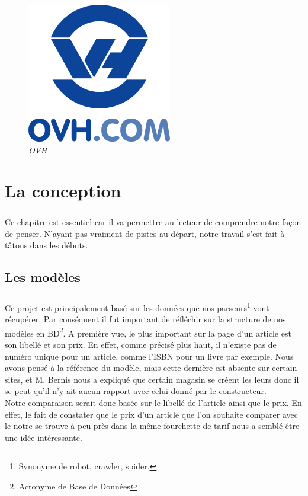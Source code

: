\documentclass{report}
\begin{document}
\begin{figure}[H]
\begin{center}
\includegraphics[scale=1.2]{ovh.jpg}
\caption{\textit{OVH}}
\end{center}
\end{figure}

\chapter{La conception}

\paragraph{}
Ce chapitre est essentiel car il va permettre au lecteur de comprendre notre façon de penser. N'ayant pas vraiment de pistes au départ, notre travail s'est fait à tâtons dans les débuts. 
\section{Les modèles}

\paragraph{}

Ce projet est principalement basé sur les données que nos parseurs\footnote{Synonyme de robot, crawler, spider.} vont récupérer. Par conséquent il fut important de réfléchir sur la structure de nos modèles en BD\footnote{Acronyme de Base de Données}. A première vue, le plus important sur la page d'un article est son libellé et son prix. En effet, comme précisé plus haut, il n'existe pas de numéro unique pour un article, comme l'ISBN pour un livre par exemple. Nous avons pensé à la référence du modèle, mais cette dernière est absente sur certain sites, et M. Bernis nous a expliqué que certain magasin se créent les leurs donc il se peut qu'il n'y ait aucun rapport avec celui donné par le constructeur.\\
Notre comparaison serait donc basée sur le libellé de l'article ainsi que le prix. En effet, le fait de constater que le prix d'un article que l'on souhaite comparer avec le notre se trouve à peu près dans la même fourchette de tarif nous a semblé être une idée intéressante.
\end{document}
